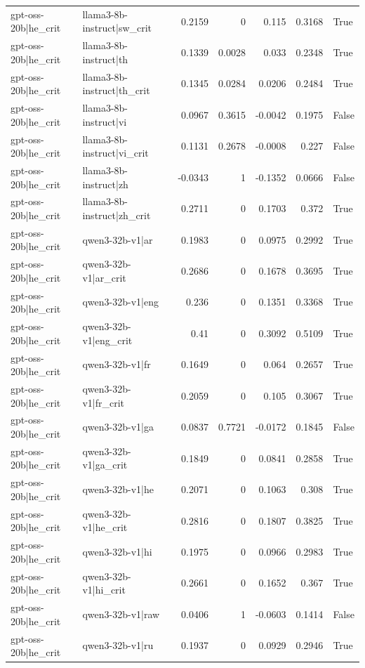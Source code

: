 \begin{table}
\begin{tabular}{l l r r r r l}
gpt-oss-20b|he_crit & llama3-8b-instruct|sw_crit & 0.2159 & 0 & 0.115 & 0.3168 & True \\
gpt-oss-20b|he_crit & llama3-8b-instruct|th & 0.1339 & 0.0028 & 0.033 & 0.2348 & True \\
gpt-oss-20b|he_crit & llama3-8b-instruct|th_crit & 0.1345 & 0.0284 & 0.0206 & 0.2484 & True \\
gpt-oss-20b|he_crit & llama3-8b-instruct|vi & 0.0967 & 0.3615 & -0.0042 & 0.1975 & False \\
gpt-oss-20b|he_crit & llama3-8b-instruct|vi_crit & 0.1131 & 0.2678 & -0.0008 & 0.227 & False \\
gpt-oss-20b|he_crit & llama3-8b-instruct|zh & -0.0343 & 1 & -0.1352 & 0.0666 & False \\
gpt-oss-20b|he_crit & llama3-8b-instruct|zh_crit & 0.2711 & 0 & 0.1703 & 0.372 & True \\
gpt-oss-20b|he_crit & qwen3-32b-v1|ar & 0.1983 & 0 & 0.0975 & 0.2992 & True \\
gpt-oss-20b|he_crit & qwen3-32b-v1|ar_crit & 0.2686 & 0 & 0.1678 & 0.3695 & True \\
gpt-oss-20b|he_crit & qwen3-32b-v1|eng & 0.236 & 0 & 0.1351 & 0.3368 & True \\
gpt-oss-20b|he_crit & qwen3-32b-v1|eng_crit & 0.41 & 0 & 0.3092 & 0.5109 & True \\
gpt-oss-20b|he_crit & qwen3-32b-v1|fr & 0.1649 & 0 & 0.064 & 0.2657 & True \\
gpt-oss-20b|he_crit & qwen3-32b-v1|fr_crit & 0.2059 & 0 & 0.105 & 0.3067 & True \\
gpt-oss-20b|he_crit & qwen3-32b-v1|ga & 0.0837 & 0.7721 & -0.0172 & 0.1845 & False \\
gpt-oss-20b|he_crit & qwen3-32b-v1|ga_crit & 0.1849 & 0 & 0.0841 & 0.2858 & True \\
gpt-oss-20b|he_crit & qwen3-32b-v1|he & 0.2071 & 0 & 0.1063 & 0.308 & True \\
gpt-oss-20b|he_crit & qwen3-32b-v1|he_crit & 0.2816 & 0 & 0.1807 & 0.3825 & True \\
gpt-oss-20b|he_crit & qwen3-32b-v1|hi & 0.1975 & 0 & 0.0966 & 0.2983 & True \\
gpt-oss-20b|he_crit & qwen3-32b-v1|hi_crit & 0.2661 & 0 & 0.1652 & 0.367 & True \\
gpt-oss-20b|he_crit & qwen3-32b-v1|raw & 0.0406 & 1 & -0.0603 & 0.1414 & False \\
gpt-oss-20b|he_crit & qwen3-32b-v1|ru & 0.1937 & 0 & 0.0929 & 0.2946 & True \\

\end{tabular}
\end{table}
